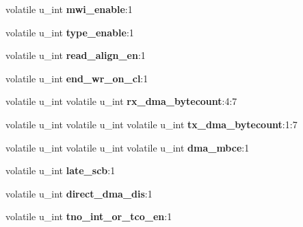 \begin{DoxyCompactItemize}
\item 
\mbox{\label{structfxp__cb__config_a1a353ca4a5ce4c10b0fb1d50d8e7e7d0}} 
volatile u\+\_\+int {\bfseries mwi\+\_\+enable}\+:1
\item 
\mbox{\label{structfxp__cb__config_aeb4ce8397d198e43ca3cebc3f577d9be}} 
volatile u\+\_\+int {\bfseries type\+\_\+enable}\+:1
\item 
\mbox{\label{structfxp__cb__config_a61efcc02460d7fa1d1a798c8df693fb5}} 
volatile u\+\_\+int {\bfseries read\+\_\+align\+\_\+en}\+:1
\item 
\mbox{\label{structfxp__cb__config_a3b62fdb3c699633126bc18be27d50d43}} 
volatile u\+\_\+int {\bfseries end\+\_\+wr\+\_\+on\+\_\+cl}\+:1
\item 
\mbox{\label{structfxp__cb__config_aa1372970bb13f4f0640be0c9e3580325}} 
volatile u\+\_\+int volatile u\+\_\+int {\bfseries rx\+\_\+dma\+\_\+bytecount}\+:4\+:7
\item 
\mbox{\label{structfxp__cb__config_aea1ed21f9e46f6752510f1f24e42a726}} 
volatile u\+\_\+int volatile u\+\_\+int volatile u\+\_\+int {\bfseries tx\+\_\+dma\+\_\+bytecount}\+:1\+:7
\item 
\mbox{\label{structfxp__cb__config_afe4acc1b65d7c2936ddf71a9194ddcf6}} 
volatile u\+\_\+int volatile u\+\_\+int volatile u\+\_\+int {\bfseries dma\+\_\+mbce}\+:1
\item 
\mbox{\label{structfxp__cb__config_a86f84fb2b603546c1a1d67abfe5e431c}} 
volatile u\+\_\+int {\bfseries late\+\_\+scb}\+:1
\item 
\mbox{\label{structfxp__cb__config_a32736c8546e86c45929505d7e6a7cf1b}} 
volatile u\+\_\+int {\bfseries direct\+\_\+dma\+\_\+dis}\+:1
\item 
\mbox{\label{structfxp__cb__config_a2c3fc31f3ab8a66d12b3003c32581243}} 
volatile u\+\_\+int {\bfseries tno\+\_\+int\+\_\+or\+\_\+tco\+\_\+en}\+:1
\item 

\end{DoxyCompactItemize}

